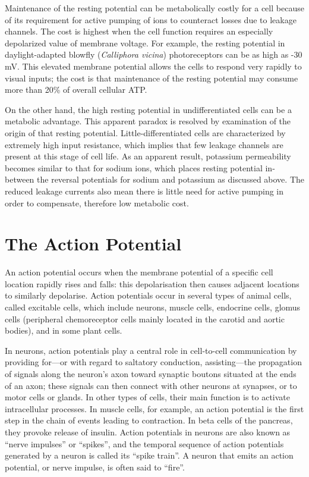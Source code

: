 \documentclass[]{book}
\begin{document}
Maintenance of the resting potential can be metabolically costly for a cell because of its requirement for active pumping of ions to counteract losses due to leakage channels. The cost is highest when the cell function requires an especially depolarized value of membrane voltage. For example, the resting potential in daylight-adapted blowfly (\emph{Calliphora vicina}) photoreceptors can be as high as -30 mV. This elevated membrane potential allows the cells to respond very rapidly to visual inputs; the cost is that maintenance of the resting potential may consume more than 20\% of overall cellular ATP.

On the other hand, the high resting potential in undifferentiated cells can be a metabolic advantage. This apparent paradox is resolved by examination of the origin of that resting potential. Little-differentiated cells are characterized by extremely high input resistance, which implies that few leakage channels are present at this stage of cell life. As an apparent result, potassium permeability becomes similar to that for sodium ions, which places resting potential in-between the reversal potentials for sodium and potassium as discussed above. The reduced leakage currents also mean there is little need for active pumping in order to compensate, therefore low metabolic cost.

\hypertarget{the-action-potential}{%
\section{The Action Potential}\label{the-action-potential}}

An action potential occurs when the membrane potential of a specific cell location rapidly rises and falls: this depolarisation then causes adjacent locations to similarly depolarise. Action potentials occur in several types of animal cells, called excitable cells, which include neurons, muscle cells, endocrine cells, glomus cells (peripheral chemoreceptor cells mainly located in the carotid and aortic bodies), and in some plant cells.

In neurons, action potentials play a central role in cell-to-cell communication by providing for---or with regard to saltatory conduction, assisting---the propagation of signals along the neuron's axon toward synaptic boutons situated at the ends of an axon; these signals can then connect with other neurons at synapses, or to motor cells or glands. In other types of cells, their main function is to activate intracellular processes. In muscle cells, for example, an action potential is the first step in the chain of events leading to contraction. In beta cells of the pancreas, they provoke release of insulin. Action potentials in neurons are also known as ``nerve impulses'' or ``spikes'', and the temporal sequence of action potentials generated by a neuron is called its ``spike train''. A neuron that emits an action potential, or nerve impulse, is often said to ``fire''.
\end{document}
